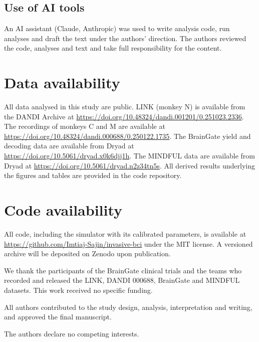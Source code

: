 \documentclass[pdflatex,sn-nature]{sn-jnl}
\begin{document}
\subsection*{Use of AI tools}

An AI assistant (Claude, Anthropic) was used to write analysis code, run analyses and draft the text under the
authors' direction. The authors reviewed the code, analyses and text and take full responsibility for the content.

\section*{Data availability}

All data analysed in this study are public. LINK (monkey N) is available from the DANDI Archive at
\url{https://doi.org/10.48324/dandi.001201/0.251023.2336}. The recordings of monkeys C and M are available at
\url{https://doi.org/10.48324/dandi.000688/0.250122.1735}. The BrainGate yield and decoding data are available from Dryad
at \url{https://doi.org/10.5061/dryad.x0k6djj1h}. The MINDFUL data are available from Dryad at
\url{https://doi.org/10.5061/dryad.n2z34tn5s}. All derived results underlying the figures and tables are provided in the
code repository.

\section*{Code availability}

All code, including the simulator with its calibrated parameters, is available at
\url{https://github.com/Imtiaj-Sajin/invasive-bci} under the MIT license. A versioned archive will be deposited on Zenodo
upon publication.

\backmatter

We thank the participants of the BrainGate clinical trials and the teams who recorded and released the LINK, DANDI
000688, BrainGate and MINDFUL datasets. This work received no specific funding.

All authors contributed to the study design, analysis, interpretation and writing, and approved the final manuscript.

The authors declare no competing interests.


\end{document}
